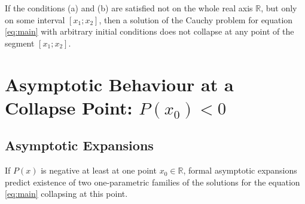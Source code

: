 \begin{corollary}
	If the conditions (a) and (b) are satisfied not on the whole real axis $\mathbb{R}$, but only on some interval $[x_1; x_2]$, then a solution of the Cauchy problem for equation \eqref{eq:main} with arbitrary initial conditions does not collapse at any point of the segment $[x_1; x_2]$.
\end{corollary}

\section{Asymptotic Behaviour at a Collapse Point: $P(x_0) < 0$}

\subsection{Asymptotic Expansions}

If $P(x)$ is negative at least at one point $x_0 \in \mathbb{R}$, formal asymptotic expansions predict existence of two one-parametric families of the solutions for the equation \eqref{eq:main} collapsing at this point.

